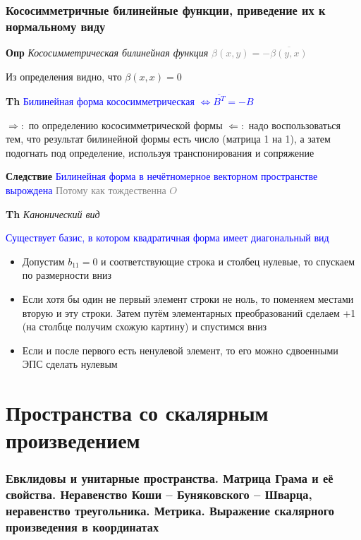 \documentclass[a4paper, 14pt]{article}
\begin{document}
    \section{Кососимметричные билинейные функции, приведение их к нормальному виду}
    
    \textbf{Опр} \textit{Кососимметрическая билинейная функция} \textcolor{gray}{$\beta (x, y) = - \overline{\beta (y, x)}$}
    
    Из определения видно, что $\beta (x, x) = 0$
    
    \textbf{Th} \textcolor{blue}{Билинейная форма кососимметрическая $\Leftrightarrow \overline{B^T}= -B$}
    
    $\Rightarrow:$ по определению кососимметрической формы
    $\Leftarrow:$ надо воспользоваться тем, что результат билинейной формы есть число (матрица 1 на 1), а затем
    подогнать под определение, используя транспонирования и сопряжение
    
    \textbf{Следствие} \textcolor{blue}{Билинейная форма в нечётномерное векторном пространстве вырождена}
    \textcolor{gray}{Потому как тождественна $O$}
    
    \textbf{Th} \textit{Канонический вид}
    
    \textcolor{blue}{Существует базис, в котором квадратичная форма имеет диагональный вид}
    
    \begin{itemize}
        \item Допустим $b_{11} = 0$ и соответствующие строка и столбец нулевые, то спускаем по размерности вниз
        \item Если хотя бы один не первый элемент строки не ноль, то поменяем местами вторую и эту строки.
        Затем путём элементарных преобразований сделаем +1 (на столбце получим схожую картину) и спустимся вниз
        \item Если и после первого есть ненулевой элемент, то его можно сдвоенными ЭПС сделать нулевым
    \end{itemize}
    
     \part*{Пространства со скалярным произведением}
    
    \section{Евклидовы и унитарные пространства.
    Матрица Грама и её свойства.
    Неравенство Коши -- Буняковского -- Шварца, неравенство треугольника.
    Метрика.
    Выражение скалярного произведения в координатах}
    
\end{document}
